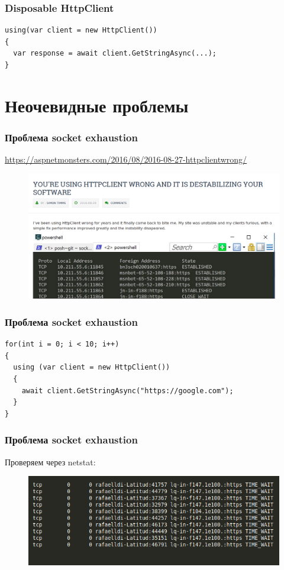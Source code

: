 \documentclass{beamer}
\begin{document}
\begin{frame}[fragile]
\frametitle{Disposable HttpClient}
\begin{lstlisting}
using(var client = new HttpClient())
{
  var response = await client.GetStringAsync(...);
}
\end{lstlisting}
\end{frame}

\section{Неочевидные проблемы}
\begin{frame}
\frametitle{Проблема socket exhaustion}
\href{https://aspnetmonsters.com/2016/08/2016-08-27-httpclientwrong/}{https://aspnetmonsters.com/2016/08/2016-08-27-httpclientwrong/}
\begin{figure}
\includegraphics[scale=0.3]{aspnetmonsters}
\end{figure}
\end{frame}

\begin{frame}[fragile]
\frametitle{Проблема socket exhaustion}
\begin{lstlisting}
for(int i = 0; i < 10; i++)
{
  using (var client = new HttpClient())
  {
    await client.GetStringAsync("https://google.com");
  }
}
\end{lstlisting}
\end{frame}

\begin{frame}
\frametitle{Проблема socket exhaustion}
Проверяем через netstat:
\begin{figure}
\includegraphics[scale=0.53]{netstat}
\end{figure}
\end{frame}
\end{document}
